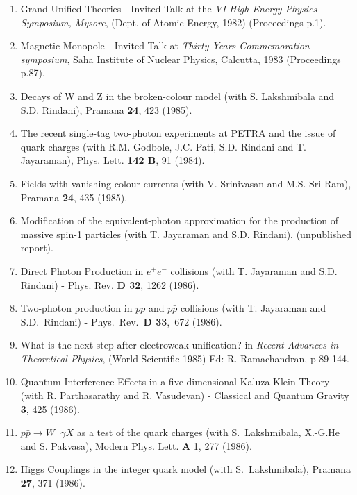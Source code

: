 \begin{enumerate}
\item Grand Unified Theories - Invited Talk at the {\it VI High Energy
Physics Symposium, Mysore}, (Dept. of Atomic Energy, 1982) (Proceedings p.1).

\item Magnetic Monopole - Invited Talk at {\it Thirty Years
Comme\-moration symposium}, Saha Institute of Nuclear Physics, Calcutta, 
1983 (Proceedings p.87).

\item Decays of W and Z in the broken-colour model (with S. Lakshmibala
and S.D. Rindani), Pramana {\bf 24}, 423 (1985).

\item The recent single-tag two-photon experiments at PETRA and the
issue of quark charges (with R.M. Godbole, J.C. Pati, S.D. Rindani and
T. Jayaraman), Phys. Lett. {\bf 142 B}, 91 (1984).

\item Fields with vanishing colour-currents (with V. Srinivasan and M.S.
Sri Ram), Pramana {\bf 24}, 435 (1985).
 
\item Modification of the equivalent-photon approximation for the
production of massive spin-1 particles (with T. Jayaraman and S.D.
Rindani), (unpublished report).

\item Direct Photon Production in $e^+ e^-$ collisions (with T.
Jaya\-raman and S.D. Rindani) - Phys. Rev. {\bf D 32}, 1262 (1986).

\item Two-photon production in $pp$ and $p\bar{p}$ collisions (with T.
Jaya\-raman and S.D.\ Rindani) - Phys.\ Rev.\ {\bf D 33},\ 672 (1986).

\item What is the next step after electroweak unification? in {\em
Recent Advances in Theoretical Physics}, (World Scientific 1985) Ed: R.
Ramachandran, p 89-144.

\item Quantum Interference Effects in a five-dimensional Kalu\-za-Klein
Theory (with R. Parthasarathy and R. Vasudevan) - Classical and Quantum
Gravity {\bf 3}, 425 (1986).

\item $p\bar{p} \rightarrow W^- \gamma X$ as a test of the quark
charges (with S.\ Lakshmibala, X.-G.He and S. Pakvasa), Modern Phys.
Lett. {\bf A} 1, 277 (1986).

\item Higgs Couplings in the integer quark model (with S.\ Lakshmibala), 
Pramana {\bf 27}, 371 (1986).


\end{enumerate}
